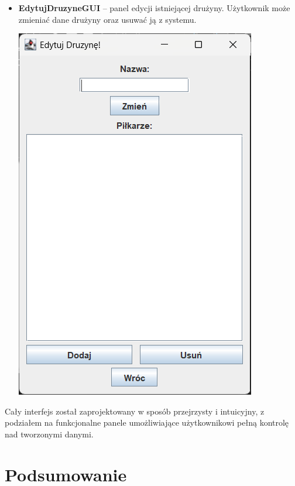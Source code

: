\documentclass{urdpl}     %
\begin{document}
\begin{itemize}
  \item
  \begin{minipage}[t]{\linewidth}
    \textbf{EdytujDruzyneGUI} -- panel edycji istniejącej drużyny. Użytkownik może zmieniać dane drużyny oraz usuwać ją z systemu.

    \vspace{0.3em}
    \begin{center}
      \includegraphics[width=0.7\linewidth]{edytujdruzyne.png}
      \label{fig:edytujdruzyne}
    \end{center}
  \end{minipage}
\end{itemize}

\vspace{1em}
\noindent
Cały interfejs został zaprojektowany w sposób przejrzysty i intuicyjny, z podziałem na funkcjonalne panele umożliwiające użytkownikowi pełną kontrolę nad tworzonymi danymi.

\chapter{Podsumowanie}\label{5}
\end{document}
